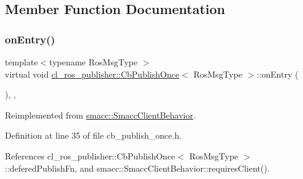 \subsection{Member Function Documentation}
\mbox{\label{classcl__ros__publisher_1_1CbPublishOnce_afaed71bc2694ec1837278d5f931a76e1}} 
\subsubsection{\texorpdfstring{on\+Entry()}{onEntry()}}
{\footnotesize\ttfamily template$<$typename Ros\+Msg\+Type $>$ \\
virtual void \hyperlink{classcl__ros__publisher_1_1CbPublishOnce}{cl\+\_\+ros\+\_\+publisher\+::\+Cb\+Publish\+Once}$<$ Ros\+Msg\+Type $>$\+::on\+Entry (\begin{DoxyParamCaption}{ }\end{DoxyParamCaption})\hspace{0.3cm}{\ttfamily [inline]}, {\ttfamily [override]}, {\ttfamily [virtual]}}



Reimplemented from \hyperlink{classsmacc_1_1SmaccClientBehavior_a7962382f93987c720ad432fef55b123f}{smacc\+::\+Smacc\+Client\+Behavior}.



Definition at line 35 of file cb\+\_\+publish\+\_\+once.\+h.



References cl\+\_\+ros\+\_\+publisher\+::\+Cb\+Publish\+Once$<$ Ros\+Msg\+Type $>$\+::defered\+Publish\+Fn, and smacc\+::\+Smacc\+Client\+Behavior\+::requires\+Client().


